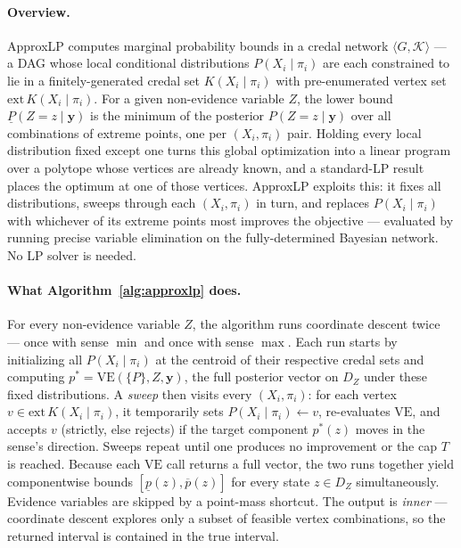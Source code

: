 \documentclass[11pt]{article}
\begin{document}
\paragraph{Overview.}
ApproxLP computes marginal probability bounds in a credal network
$\langle G, \mathcal{K} \rangle$ --- a DAG whose local conditional
distributions $P(X_i \mid \pi_i)$ are each constrained to lie in a
finitely-generated credal set $K(X_i \mid \pi_i)$ with pre-enumerated
vertex set $\mathrm{ext}\,K(X_i \mid \pi_i)$. For a given non-evidence
variable $Z$, the lower bound $\underline{P}(Z{=}z \mid \mathbf{y})$ is the
minimum of the posterior $P(Z{=}z \mid \mathbf{y})$ over all combinations of
extreme points, one per $(X_i, \pi_i)$ pair. Holding every local distribution
fixed except one turns this global optimization into a linear program over a
polytope whose vertices are already known, and a standard-LP result places
the optimum at one of those vertices. ApproxLP exploits this: it fixes all
distributions, sweeps through each $(X_i, \pi_i)$ in turn, and replaces
$P(X_i \mid \pi_i)$ with whichever of its extreme points most improves the
objective --- evaluated by running precise variable elimination on the
fully-determined Bayesian network. No LP solver is needed.

\paragraph{What Algorithm~\ref{alg:approxlp} does.}
For every non-evidence variable $Z$, the algorithm runs coordinate descent
twice --- once with sense $\min$ and once with sense $\max$. Each run starts
by initializing all $P(X_i \mid \pi_i)$ at the centroid of their respective
credal sets and computing $p^* = \mathrm{VE}(\{P\}, Z, \mathbf{y})$, the full
posterior vector on $D_Z$ under these fixed distributions. A \emph{sweep}
then visits every $(X_i, \pi_i)$: for each vertex $v \in
\mathrm{ext}\,K(X_i \mid \pi_i)$, it temporarily sets $P(X_i \mid \pi_i)
\gets v$, re-evaluates $\mathrm{VE}$, and accepts $v$ (strictly, else rejects)
if the target component $p^*(z)$ moves in the sense's direction. Sweeps
repeat until one produces no improvement or the cap $T$ is reached. Because
each $\mathrm{VE}$ call returns a full vector, the two runs together yield
componentwise bounds $[\underline{p}(z), \overline{p}(z)]$ for every state
$z \in D_Z$ simultaneously. Evidence variables are skipped by a point-mass
shortcut. The output is \emph{inner} --- coordinate descent explores only
a subset of feasible vertex combinations, so the returned interval is
contained in the true interval.
\end{document}
